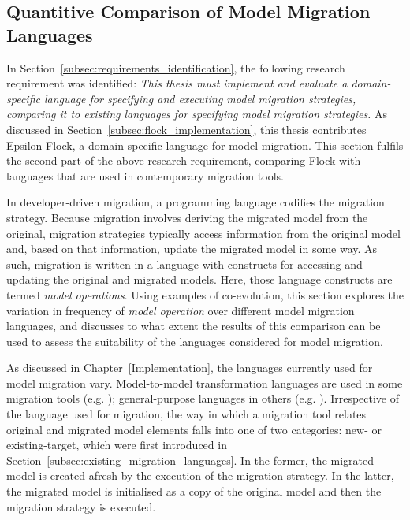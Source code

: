 
\subsection{Quantitive Comparison of Model Migration Languages}
In Section~\ref{subsec:requirements_identification}, the following research requirement was identified: \emph{This thesis must implement and evaluate a domain-specific language for specifying and executing model migration strategies, comparing it to existing languages for specifying model migration strategies.} As discussed in Section~\ref{subsec:flock_implementation}, this thesis contributes Epsilon Flock, a domain-specific language for model migration. This section fulfils the second part of the above research requirement, comparing Flock with languages that are used in contemporary migration tools. 

In developer-driven migration, a programming language codifies the migration strategy. Because migration involves deriving the migrated model from the original, migration strategies typically access information from the original model and, based on that information, update the migrated model in some way. As such, migration is written in a language with constructs for accessing and updating the original and migrated models. Here, those language constructs are termed \textit{model operations}. Using examples of co-evolution, this section explores the variation in frequency of \emph{model operation} over different model migration languages, and discusses to what extent the results of this comparison can be used to assess the suitability of the languages considered for model migration.

As discussed in Chapter~\ref{Implementation}, the languages currently used for model migration vary. Model-to-model transformation languages are used in some migration tools (e.g. \cite{cicchetti,garces}); general-purpose languages in others (e.g. \cite{ecore2ecore,cope}). Irrespective of the language used for migration, the way in which a migration tool relates original and migrated model elements falls into one of two categories: new- or existing-target, which were first introduced in Section~\ref{subsec:existing_migration_languages}. In the former, the migrated model is created afresh by the execution of the migration strategy. In the latter, the migrated model is initialised as a copy of the original model and then the migration strategy is executed.

